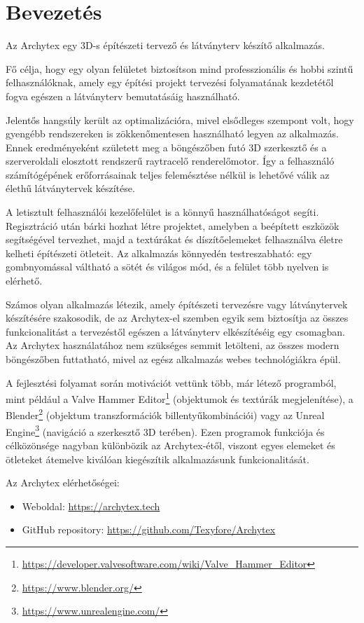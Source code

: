 \part{Bevezetés}

Az Archytex egy 3D-s építészeti tervező és látványterv készítő alkalmazás.

Fő célja, hogy egy olyan felületet biztosítson mind professzionális és hobbi szintű felhasználóknak, amely egy építési projekt tervezési folyamatának kezdetétől fogva egészen a látványterv bemutatásáig használható.

Jelentős hangsúly került az optimalizációra, mivel elsődleges szempont volt, hogy gyengébb rendszereken is zökkenőmentesen használható legyen az alkalmazás. Ennek eredményeként született meg a böngészőben futó 3D szerkesztő és a szerveroldali elosztott rendszerű raytracelő renderelőmotor. Így a felhasználó számítógépének erőforrásainak teljes felemésztése nélkül is lehetővé válik az élethű látványtervek készítése.

A letisztult felhasználói kezelőfelület is a könnyű használhatóságot segíti. Regisztráció után bárki hozhat létre projektet, amelyben a beépített eszközök segítségével tervezhet, majd a textúrákat és díszítőelemeket felhasználva életre kelheti építészeti ötleteit. Az alkalmazás könnyedén testreszabható: egy gombnyomással váltható a sötét és világos mód, és a felület több nyelven is elérhető.

Számos olyan alkalmazás létezik, amely építészeti tervezésre vagy látványtervek készítésére szakosodik, de az Archytex-el szemben egyik sem biztosítja az összes funkcionalitást a tervezéstől egészen a látványterv elkészítéséig egy csomagban. Az Archytex használatához nem szükséges semmit letölteni, az összes modern böngészőben futtatható, mivel az egész alkalmazás webes technológiákra épül.

A fejlesztési folyamat során motivációt vettünk több, már létező programból, mint például a Valve Hammer Editor\footnote{\url{https://developer.valvesoftware.com/wiki/Valve\_Hammer\_Editor}} (objektumok és textúrák megjelenítése), a Blender\footnote{\url{https://www.blender.org/}} (objektum transzformációk billentyűkombinációi) vagy az Unreal Engine\footnote{\url{https://www.unrealengine.com/}} (navigáció a szerkesztő 3D terében). Ezen programok funkciója és célközönsége nagyban különbözik az Archytex-étől, viszont egyes elemeket és ötleteket átemelve kiválóan kiegészítik alkalmazásunk funkcionalitását.

Az Archytex elérhetőségei:
\begin{itemize}
  \item Weboldal: \url{https://archytex.tech}
  \item GitHub repository: \url{https://github.com/Texyfore/Archytex}
\end{itemize}